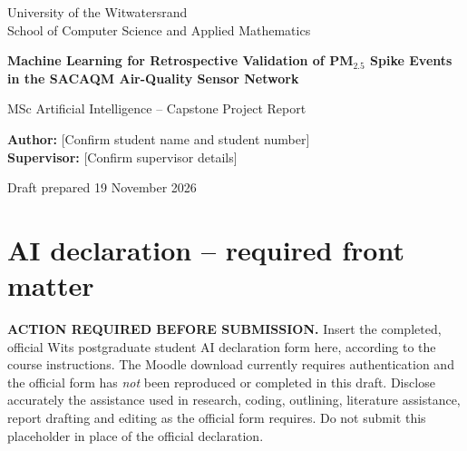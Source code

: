 \documentclass[12pt,a4paper,oneside]{report}
\begin{document}
\begin{titlepage}
\centering
\vspace*{2cm}
{\large University of the Witwatersrand\\School of Computer Science and Applied Mathematics\par}
\vspace{2.3cm}
{\Huge\bfseries Machine Learning for Retrospective Validation of PM$_{2.5}$ Spike Events in the SACAQM Air-Quality Sensor Network\par}
\vspace{1cm}
{\large MSc Artificial Intelligence -- Capstone Project Report\par}
\vspace{1cm}
{\large \textbf{Author:} [Confirm student name and student number]\\\textbf{Supervisor:} [Confirm supervisor details]\par}
\vfill
{\large Draft prepared 19 November 2026\par}
\vspace{0.5cm}
\vfill
\end{titlepage}
\chapter*{AI declaration -- required front matter}
\textbf{ACTION REQUIRED BEFORE SUBMISSION.} Insert the completed, official Wits postgraduate student AI declaration form here, according to the course instructions. The Moodle download currently requires authentication and the official form has \emph{not} been reproduced or completed in this draft. Disclose accurately the assistance used in research, coding, outlining, literature assistance, report drafting and editing as the official form requires. Do not submit this placeholder in place of the official declaration.
\end{document}
